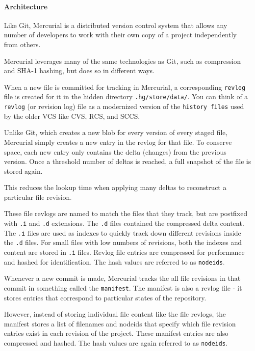 \paragraph{Architecture}
Like Git, Mercurial is a distributed version control system that allows any number of developers to work with their own copy of a project independently from others.

Mercurial leverages many of the same technologies as Git, such as compression and SHA-1 hashing, but does so in different ways.

When a new file is committed for tracking in Mercurial, a corresponding \lstinline{revlog} file is created for it in the hidden directory \lstinline{.hg/store/data/}. You can think of a \lstinline{revlog} (or revision log) file as a modernized version of the \lstinline{history files} used by the older VCS like CVS, RCS, and SCCS.

Unlike Git, which creates a new blob for every version of every staged file, Mercurial simply creates a new entry in the revlog for that file. To conserve space, each new entry only contains the delta (changes) from the previous version. Once a threshold number of deltas is reached, a full snapshot of the file is stored again.

This reduces the lookup time when applying many deltas to reconstruct a particular file revision.

These file revlogs are named to match the files that they track, but are postfixed with \lstinline{.i} and \lstinline{.d} extensions. The \lstinline{.d} files contained the compressed delta content. The \lstinline{.i} files are used as indexes to quickly track down different revisions inside the \lstinline{.d} files. For small files with low numbers of revisions, both the indexes and content are stored in \lstinline{.i} files. Revlog file entries are compressed for performance and hashed for identification. The hash values are referred to as \lstinline{nodeids}.

Whenever a new commit is made, Mercurial tracks the all file revisions in that commit in something called the \lstinline{manifest}. The manifest is also a revlog file - it stores entries that correspond to particular states of the repository.

However, instead of storing individual file content like the file revlogs, the manifest stores a list of filenames and nodeids that specify which file revision entries exist in each revision of the project. These manifest entries are also compressed and hashed. The hash values are again referred to as \lstinline{nodeids}.


